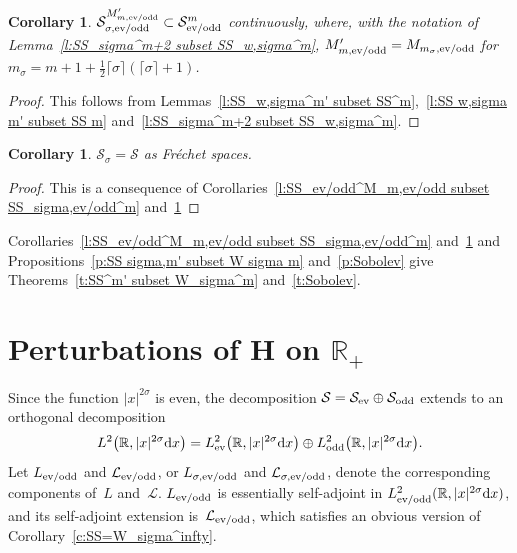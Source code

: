 \documentclass[pdftex]{sigma}
\newtheorem{Corollary}[Theorem]{Corollary}
\newcommand{\R}{\mathbb{R}}
\newcommand{\LL}{\mathcal{L}}
\renewcommand{\SS}{\mathcal{S}}
\begin{document}
\begin{Corollary}\label{c:SS_sigma^m' subset SS^m}
  $\SS_{\sigma,\text{\rm ev/odd}}^{M'_{m,\text{\rm ev/odd}}}\subset\SS_{\text{\rm ev/odd}}^m$ continuously, where, with the notation of Lemma~{\rm \ref{l:SS_sigma^m+2 subset SS_w,sigma^m}}, $M'_{m,\text{\rm ev/odd}}=M_{m_\sigma,\text{\rm ev/odd}}$ for $m_\sigma=m+1+\frac{1}{2}\lceil\sigma\rceil(\lceil\sigma\rceil+1)$.
\end{Corollary}

\begin{proof}
  This follows from Lemmas~\ref{l:SS_w,sigma^m' subset SS^m},~\ref{l:SS w,sigma m' subset SS m} and~\ref{l:SS_sigma^m+2 subset SS_w,sigma^m}.
\end{proof}

\begin{Corollary}\label{c:SS_sigma = SS}
  $\SS_\sigma=\SS$ as Fr\'echet spaces.
\end{Corollary}

\begin{proof}
  This is a consequence of Corollaries~\ref{l:SS_ev/odd^M_m,ev/odd subset SS_sigma,ev/odd^m} and~\ref{c:SS_sigma^m' subset SS^m}
\end{proof}

Corollaries~\ref{l:SS_ev/odd^M_m,ev/odd subset SS_sigma,ev/odd^m} and~\ref{c:SS_sigma^m' subset SS^m} and Propositions~\ref{p:SS sigma,m' subset W sigma m} and~\ref{p:Sobolev} give Theorems~\ref{t:SS^m' subset W_sigma^m} and~\ref{t:Sobolev}.


\section[Perturbations of $H$ on $\R_+$]{Perturbations of $\boldsymbol{H}$ on $\boldsymbol{\R_+}$}\label{s:P}

Since the function $|x|^{2\sigma}$ is even, the decomposition $\SS=\SS_{\text{\rm ev}}\oplus\SS_{\text{\rm odd}}$ extends to an orthogonal decomposition
\[
    L^2\big(\R,|x|^{2\sigma}{\rm d}x\big)
    =L^2_{\text{\rm ev}}\big(\R,|x|^{2\sigma}{\rm d}x\big)\oplus L^2_{\text{\rm odd}}\big(\R,|x|^{2\sigma}{\rm d}x\big) .
\]
Let $L_{\text{\rm ev/odd}}$ and $\LL_{\text{\rm ev/odd}}$, or $L_{\sigma,\text{\rm ev/odd}}$ and $\LL_{\sigma,\text{\rm ev/odd}}$, denote the corresponding components of~$L$ and~$\LL$. $L_{\text{\rm ev/odd}}$ is essentially self-adjoint in $L^2_{\text{\rm ev/odd}}(\R,|x|^{2\sigma}{\rm d}x)$, and its self-adjoint extension is~$\LL_{\text{\rm ev/odd}}$, which satisf\/ies an obvious version of Corollary~\ref{c:SS=W_sigma^infty}.
\end{document}
